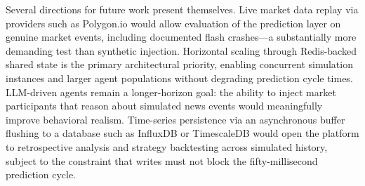 \documentclass[conference]{IEEEtran}
\begin{document}
Several directions for future work present themselves. Live
market data replay via providers such as Polygon.io would allow
evaluation of the prediction layer on genuine market events, including
documented flash crashes---a substantially more demanding test than
synthetic injection. Horizontal scaling through Redis-backed shared
state is the primary architectural priority, enabling concurrent
simulation instances and larger agent populations without degrading
prediction cycle times. LLM-driven agents remain a
longer-horizon goal: the ability to inject market participants that
reason about simulated news events would meaningfully improve
behavioral realism. Time-series persistence via an asynchronous buffer
flushing to a database such as InfluxDB or TimescaleDB would open the
platform to retrospective analysis and strategy backtesting across
simulated history, subject to the constraint that writes must not
block the fifty-millisecond prediction cycle.
\end{document}
